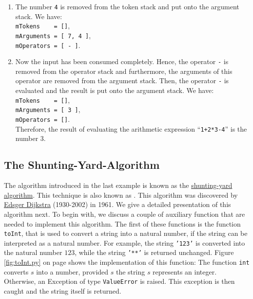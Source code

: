 \begin{enumerate}
\item The number \texttt{4} is removed from the token stack and put onto the argument stack. We have: \\[0.2cm]
      \hspace*{1.3cm} \texttt{mTokens \ \ \ = []}, \\[0.2cm]
      \hspace*{1.3cm} \texttt{mArguments = [ 7, 4 ]}, \\[0.2cm]
      \hspace*{1.3cm} \texttt{mOperators = [ - ]}. 
\item Now the input has been consumed completely.
      Hence, the operator \texttt{-} is removed from the  operator stack and
      furthermore, the arguments of this operator are removed from the argument stack.  Then, the
      operator \texttt{-} is evaluated and the result is put onto the argument
      stack.  We have: \\[0.2cm]
      \hspace*{1.3cm} \texttt{mTokens \ \ \ = []}, \\[0.2cm]
      \hspace*{1.3cm} \texttt{mArguments = [ 3 ]}, \\[0.2cm]
      \hspace*{1.3cm} \texttt{mOperators = []}. \\[0.2cm]
      Therefore, the result of evaluating the arithmetic expression ``\texttt{1+2*3-4}'' is the
      number 3.
\end{enumerate}

\subsection{The Shunting-Yard-Algorithm \label{algo-arith}}
The algorithm introduced in the last example is known as the 
\href{http://en.wikipedia.org/wiki/Shunting-yard_algorithm}{shunting-yard algorithm}.  This technique is also
known as .
This algorithm was discovered by  \href{http://en.wikipedia.org/wiki/Edsger_Dijkstra}{Edsger Dijkstra} (1930-2002) in
1961.  We give a detailed presentation of this algorithm next.  To begin with, we discuss a couple of auxiliary
function that are needed to implement this algorithm.  The first of these functions is the function
\texttt{toInt}, that is used to convert a string into a natural number, if the string can be interpreted as a
natural number.  For example, the string \texttt{'123'} is converted into the natural number $123$, while the
string \texttt{'**'} is returned unchanged.  Figure \ref{fig:toInt.py} on page \pageref{fig:toInt.py} shows the
implementation of this function:  The function \texttt{int} converts $s$ into a number, provided $s$ the string
$s$ represents an integer.  Otherwise, an Exception of type \texttt{ValueError} is raised.  This exception is
then caught and the string itself is returned.


